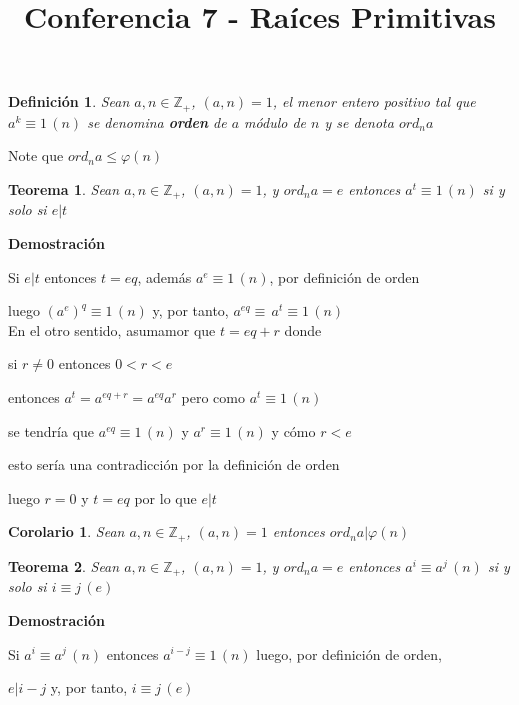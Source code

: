 \documentclass[a4paper,12pt]{report}
\title{Conferencia 7 - Raíces Primitivas}
\author{}
\newtheorem*{teo}{Teorema}
\newtheorem*{cor}{Corolario}
\newtheorem*{dfn}{Definición}
\begin{document}
\maketitle



\begin{dfn}
Sean $a,n\in\mathbb{Z}_+$, $(a,n)=1$, el menor entero positivo tal que $a^k \equiv 1 \, (n)$ se denomina
\textbf{orden} de $a$ módulo de $n$ y se denota $ord_na$
\end{dfn}

Note que $ord_na\leq\varphi(n)$

\begin{teo}
 Sean $a,n\in\mathbb{Z}_+$, $(a,n)=1$, y $ord_na=e$ entonces $a^t \equiv 1 \, (n)$ si y solo si $e|t$
\end{teo}

\textbf{Demostración}

Si $e|t$ entonces $t=eq$, además $a^e \equiv 1 \, (n)$, por definición de orden

luego $(a^e)^q \equiv 1 \, (n)$ y, por tanto, $a^{eq}\equiv\, a^t  \equiv 1 \, (n)$ 
\\

En el otro sentido, asumamor que $t=eq+r$ donde 

si $r\neq 0$ entonces $0<r<e$

entonces $a^t=a^{eq+r}=a^{eq}a^r$ pero como  $a^t \equiv 1 \, (n)$ 

se tendría que $a^{eq} \equiv 1 \, (n)$ y $a^r \equiv 1 \, (n)$   y cómo $r<e$ 

esto sería una contradicción por la definición de orden

luego $r=0$ y $t=eq$ por lo que $e|t$

\begin{cor}
 Sean $a,n\in\mathbb{Z}_+$, $(a,n)=1$ entonces $ord_na|\varphi(n)$
\end{cor}


\begin{teo}
 Sean $a,n\in\mathbb{Z}_+$, $(a,n)=1$, y $ord_na=e$ entonces $a^i \equiv a^j \, (n)$ si y solo si
 $i \equiv j \, (e)$
\end{teo}

\textbf{Demostración}

Si $a^i \equiv a^j \, (n)$ entonces $a^{i-j} \equiv 1 \, (n)$ luego, por definición de orden,

$e|i-j$ y, por tanto,  $i \equiv j \, (e)$
\\
\end{document}
